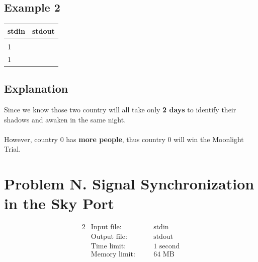 \documentclass[12pt,a4paper]{article}
\begin{document}
\subsection*{\fontsize{16}{12}Example 2}
\begin{table}[h]
    \centering
    \begin{tabularx}{\textwidth}{|>{\ttfamily}X|>{\ttfamily}X|}
        \hline
        \textbf{stdin} & \textbf{stdout} \\
        \hline
        2 & 0 \\
        3 1 &\\
        2 1 &\\
        \hline
    \end{tabularx}
\end{table}

\subsection*{\fontsize{16}{12}Explanation}
Since we know those two country will all take only \textbf{2 days} to identify their shadows and awaken in the same night.
\\\\
\noindent
However, country 0 has \textbf{more people}, thus country 0 will win the Moonlight Trial.

\newpage
\section*{\fontsize{18}{12}Problem N. Signal Synchronization in the Sky Port}

\begin{alignat*}{2}
 &   \text{Input file:}   \quad     &&\text{stdin}\\
 &   \text{Output file:}  \quad     &&\text{stdout}\\
 &   \text{Time limit:}   \quad     &&\text{1 second}\\
 &   \text{Memory limit:} \quad     &&\text{64 MB}
\end{alignat*}
\end{document}
